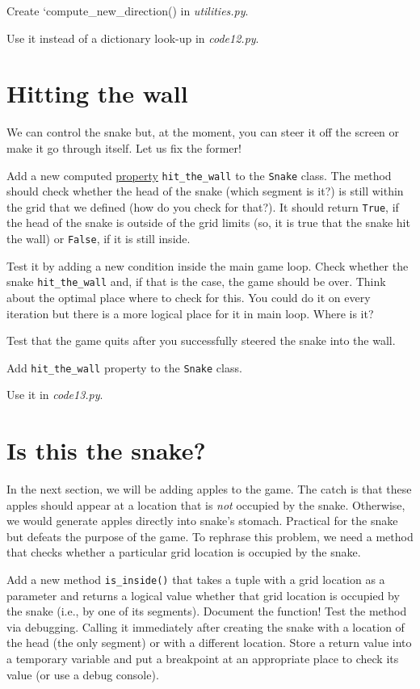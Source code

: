 \documentclass[
]{book}
\begin{document}
Create `compute\_new\_direction() in \emph{utilities.py}.

Use it instead of a dictionary look-up in \emph{code12.py}.

\hypertarget{hitting-the-wall-1}{%
\section{Hitting the wall}\label{hitting-the-wall-1}}

We can control the snake but, at the moment, you can steer it off the screen or make it go through itself. Let us fix the former!

Add a new computed \protect\hyperlink{computed-attribute-property}{property} \texttt{hit\_the\_wall} to the \texttt{Snake} class. The method should check whether the head of the snake (which segment is it?) is still within the grid that we defined (how do you check for that?). It should return \texttt{True}, if the head of the snake is outside of the grid limits (so, it is true that the snake hit the wall) or \texttt{False}, if it is still inside.

Test it by adding a new condition inside the main game loop. Check whether the snake \texttt{hit\_the\_wall} and, if that is the case, the game should be over. Think about the optimal place where to check for this. You could do it on every iteration but there is a more logical place for it in main loop. Where is it?

Test that the game quits after you successfully steered the snake into the wall.

Add \texttt{hit\_the\_wall} property to the \texttt{Snake} class.

Use it in \emph{code13.py}.

\hypertarget{is-this-the-snake}{%
\section{Is this the snake?}\label{is-this-the-snake}}

In the next section, we will be adding apples to the game. The catch is that these apples should appear at a location that is \emph{not} occupied by the snake. Otherwise, we would generate apples directly into snake's stomach. Practical for the snake but defeats the purpose of the game. To rephrase this problem, we need a method that checks whether a particular grid location is occupied by the snake.

Add a new method \texttt{is\_inside()} that takes a tuple with a grid location as a parameter and returns a logical value whether that grid location is occupied by the snake (i.e., by one of its segments). Document the function! Test the method via debugging. Calling it immediately after creating the snake with a location of the head (the only segment) or with a different location. Store a return value into a temporary variable and put a breakpoint at an appropriate place to check its value (or use a debug console).
\end{document}
